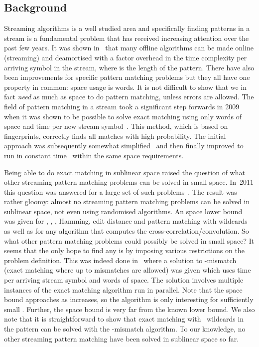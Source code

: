 \documentclass[11pt,a4paper]{article}
\theoremstyle{theorem}
\begin{document}
\subsection{Background}

Streaming algorithms is a well studied area and specifically finding patterns in a stream is a fundamental problem that has received increasing attention over the past few years. It was shown in~\cite{CEPP:2008} that many offline algorithms can be made online (streaming) and deamortised with a  factor overhead in the time complexity per arriving symbol in the stream, where  is the length of the pattern. There have also been improvements for specific pattern matching problems but they all have one property in common: space usage is  words. It is not difficult to show that we in fact \emph{need} as much as  space to do pattern matching, unless errors are allowed.
The field of pattern matching in a stream took a significant step forwards in 2009 when it was shown to be possible to solve exact matching using only  words of space and  time per new stream symbol~\cite{Porat:09}.  This method, which is based on fingerprints, correctly finds all matches with high probability. The initial approach was subsequently somewhat simplified~\cite{EJS:2010} and then finally improved to run in constant time~\cite{BG:2011} within the same space requirements.

Being able to do exact matching in sublinear space raised the question of what other streaming pattern matching problems can be solved in small space. In~2011 this question was answered for a large set of such problems~\cite{CJPS:2011}. The result was rather gloomy: almost no streaming pattern matching problems can be solved in sublinear space, not even using randomised algorithms. An  space lower bound was given for , , , Hamming, edit distance and pattern matching with wildcards as well as for any algorithm that computes the cross-correlation/convolution. So what other pattern matching problems could possibly be solved in small space? It seems that the only hope to find any is by imposing various restrictions on the problem definition. This was indeed done in~\cite{Porat:09} where a solution to -mismatch (exact matching where up to  mismatches are allowed) was given which uses  time per arriving stream symbol and  words of space. The solution involves multiple instances of the exact matching algorithm run in parallel. Note that the space bound approaches  as  increases, so the algorithm is only interesting for sufficiently small . Further, the space bound is very far from the known  lower bound.
We also note that it is straightforward to show that exact matching with ~wildcards in the pattern can be solved with the -mismatch algorithm. To our knowledge, no other streaming pattern matching have been solved in sublinear space so far.
\end{document}
